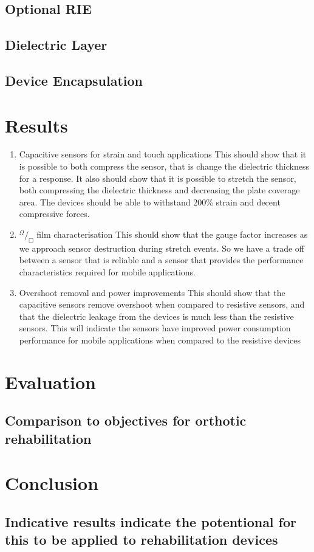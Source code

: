 \documentclass[11pt,twoside,a4paper]{article}
\newcommand*\rfrac[2]{{}^{#1}\!/_{#2}}
\begin{document}
		\subsection{Optional RIE}
		\subsection{Dielectric Layer}
		\subsection{Device Encapsulation}
	\newpage
	\section{Results}
		\begin{enumerate}
			\item Capacitive sensors for strain and touch applications \newline
				This should show that it is possible to both compress the sensor, that is change the dielectric thickness for a response. It also should show that it is possible to stretch 				the sensor, both compressing the dielectric thickness and decreasing the plate coverage area. The devices should be able to withstand 200\% strain and decent 					compressive forces.
			\item $ \rfrac{\Omega}{\Box} $ film characterisation \newline
				This should show that the gauge factor increases as we approach sensor destruction during stretch events. So we have a trade off between a sensor that is reliable 	
				and a sensor that provides the performance characteristics required for mobile applications.
			\item Overshoot removal and power improvements \newline
				This should show that the capacitive sensors remove overshoot when compared to resistive sensors, and that the dielectric leakage from the devices is much less					than the resistive sensors. This will indicate the sensors have improved power consumption performance for mobile applications when compared to the resistive 						devices
		\end{enumerate}
	\newpage
	\section{Evaluation}
		\subsection{Comparison to objectives for orthotic rehabilitation}
	\newpage
	\section{Conclusion}
		\subsection{Indicative results indicate the potentional for this to be applied to rehabilitation devices}
\end{document}
